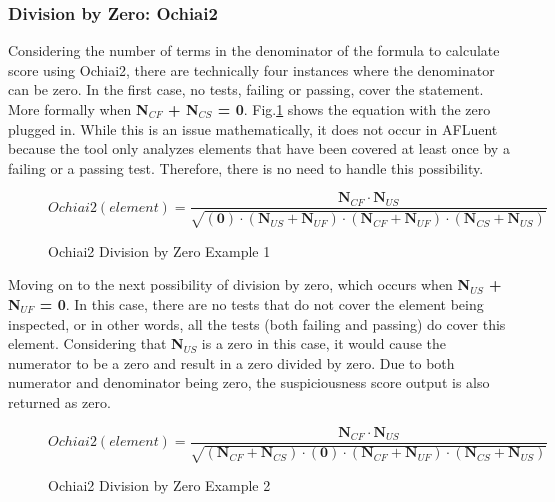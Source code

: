\subsubsection{Division by Zero: Ochiai2}
\label{subsubsec:div_by_zero_ochiai2}

Considering the number of terms in the denominator of the formula to calculate
score using Ochiai2, there are technically four instances where the denominator
can be zero. In the first case, no tests, failing or passing, cover the
statement. More formally when \textbf{N$_{CF}$ + N$_{CS}$ = 0}.
Fig.\ref{fig:ochiai2_div_by_zero_1} shows the equation with the zero plugged in.
While this is an issue mathematically, it does not occur in AFLuent because the
tool only analyzes elements that have been covered at least once by a failing or
a passing test. Therefore, there is no need to handle this possibility.

\begin{figure}[!htb]
	\begin{center}
		\begin{equation}
			Ochiai2(element) = \frac{\textbf{N$_{CF}$}\cdot{\textbf{N$_{US}$}}}{\sqrt{(\textbf{0}) \cdot (\textbf{N$_{US}$}  + \textbf{N$_{UF}$}) \cdot (\textbf{N$_{CF}$}  + \textbf{N$_{UF}$}) \cdot (\textbf{N$_{CS}$}  + \textbf{N$_{US}$})}}
		\end{equation}
		\caption{\label{fig:ochiai2_div_by_zero_1} Ochiai2 Division by Zero
		Example 1}
	\end{center}
\end{figure}

Moving on to the next possibility of division by zero, which occurs when
\textbf{N$_{US}$ + N$_{UF}$ = 0}. In this case, there are no tests that do not
cover the element being inspected, or in other words, all the tests (both
failing and passing) do cover this element. Considering that \textbf{N$_{US}$}
is a zero in this case, it would cause the numerator to be a zero and result in
a zero divided by zero. Due to both numerator and denominator being zero, the
suspiciousness score output is also returned as zero.

\begin{figure}[!htb]
	\begin{center}
		\begin{equation}
			Ochiai2(element) = \frac{\textbf{N$_{CF}$}\cdot{\textbf{N$_{US}$}}}{\sqrt{(\textbf{N$_{CF}$}  + \textbf{N$_{CS}$}) \cdot (\textbf{0}) \cdot (\textbf{N$_{CF}$}  + \textbf{N$_{UF}$}) \cdot (\textbf{N$_{CS}$}  + \textbf{N$_{US}$})}}
		\end{equation}
		\caption{\label{fig:ochiai2_div_by_zero_2}  Ochiai2 Division by Zero
		Example 2}
	\end{center}
\end{figure}

